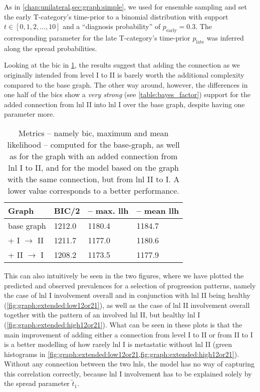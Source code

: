 \documentclass[\relativeRoot/main.tex]{subfiles}
\begin{document}
As in \cref{chap:unilateral,sec:graph:simple}, we used  for ensemble sampling and set the early T-category's time-prior to a binomial distribution with support $t \in [0, 1, 2, \ldots, 10]$ and a ``diagnosis probability'' of $p_\text{early} = 0.3$. The corresponding parameter for the late T-category's time-prior $p_\text{late}$ was inferred along the spread probabilities.

Looking at the \gls{bic} in \cref{table:graph:extend:12or21}, the results suggest that adding the connection as we originally intended from level I to II is barely worth the additional complexity compared to the base graph. The other way around, however, the differences in one half of the \glspl{bic} show a \emph{very strong} (see \cref{table:bayes_factor}) support for the added connection from \gls{lnl} II into \gls{lnl} I over the base graph, despite having one parameter more.

\begin{table}
    \centering
        \begin{tabular}{|l|l|l|l|}
            \hline
            \textbf{Graph} & \textbf{BIC/2} & \textbf{-- max. llh} & \textbf{-- mean llh} \\
            \hline
            base graph & 1212.0 & 1180.4 & 1184.7 \\
            + I $\rightarrow$ II & 1211.7 & 1177.0 & 1180.6 \\
            + II $\rightarrow$ I & 1208.2 & 1173.5 & 1177.9 \\
            \hline
        \end{tabular}
        \caption[
            Comparison of performance metrics for connection between LNL I and II
        ]{
            Metrics -- namely \gls{bic}, maximum and mean likelihood -- computed for the base-graph, as well as for the graph with an added connection from \gls{lnl} I to II, and for the model based on the graph with the same connection, but from \gls{lnl} II to I. A lower value corresponds to a better performance.
        }
        \label{table:graph:extend:12or21}
\end{table}

This can also intuitively be seen in the two figures, where we have plotted the predicted and observed prevalences for a selection of progression patterns, namely the case of \gls{lnl} I involvement overall and in conjunction with \gls{lnl} II being healthy (\cref{fig:graph:extended:low12or21}), as well as the case of \gls{lnl} II involvement overall together with the pattern of an involved \gls{lnl} II, but healthy \gls{lnl} I (\cref{fig:graph:extended:high12or21}). What can be seen in these plots is that the main improvement of adding either a connection from level I to II or from II to I is a better modelling of how rarely \gls{lnl} I is metastatic without \gls{lnl} II (green histograms in \cref{fig:graph:extended:low12or21,fig:graph:extended:high12or21}). Without any connection between the two \glspl{lnl}, the model has no way of capturing this correlation correctly, because \gls{lnl} I involvement has to be explained solely by the spread parameter $\tilde{t}_1$.
\end{document}
